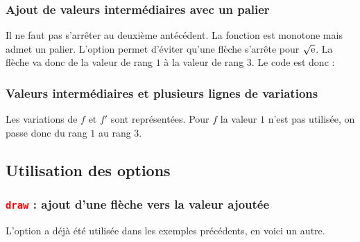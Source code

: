 \subsubsection{Ajout de valeurs intermédiaires  avec un palier}

Il ne faut pas s'arrêter au deuxième antécédent. La fonction est  monotone mais admet un palier. L'option  permet d'éviter qu'une flèche s'arrête pour $\sqrt{\mathrm{e}}$. La flèche va donc de la valeur de rang $1$ à la valeur de rang $3$. Le code est donc :
\begin{tkzexample}
\end{tkzexample}

\begin{tkzexample}
\end{tkzexample}


\subsubsection{Valeurs intermédiaires et plusieurs lignes de variations }

Les variations de  $f$ et $f'$ sont représentées. Pour $f$ la valeur $1$ n'est pas utilisée, on passe donc du rang $1$ au rang $3$.

\begin{tkzexample}
\end{tkzexample}

\subsection{Utilisation des options}

\subsubsection{\texttt{\textcolor{red}{draw}} : ajout d'une flèche vers la valeur ajoutée}
L'option a déjà été utilisée dans les exemples précédents, en voici un autre.

